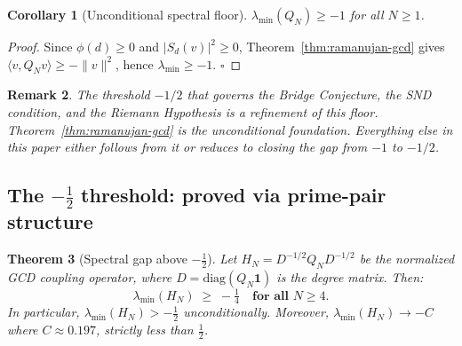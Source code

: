\documentclass[12pt]{article}
\newtheorem{theorem}{Theorem}
\newtheorem{corollary}[theorem]{Corollary}
\newtheorem{remark}[theorem]{Remark}
\begin{document}
\begin{corollary}[Unconditional spectral floor]
\label{cor:spectral-floor}
$\lambda_{\min}(Q_N) \ge -1$ for all $N \ge 1$.
\end{corollary}

\begin{proof}
Since $\phi(d)\ge0$ and $|S_d(v)|^2\ge0$, Theorem~\ref{thm:ramanujan-gcd}
gives $\langle v,Q_N v\rangle \ge -\|v\|^2$, hence $\lambda_{\min}\ge-1$. $\square$
\end{proof}


\begin{remark}
The threshold $-1/2$ that governs the Bridge Conjecture, the SND condition,
and the Riemann Hypothesis is a \emph{refinement} of this floor.
Theorem~\ref{thm:ramanujan-gcd} is the unconditional foundation.
Everything else in this paper either follows from it or reduces to closing
the gap from $-1$ to $-1/2$.
\end{remark}

\subsection{The $-\tfrac{1}{2}$ threshold: proved via prime-pair structure}
\label{subsec:theorem2}

\begin{theorem}[Spectral gap above $-\tfrac{1}{2}$]
\label{thm:half-bound}
Let $H_N = D^{-1/2}Q_N D^{-1/2}$ be the normalized GCD coupling operator,
where $D = \mathrm{diag}(Q_N \mathbf{1})$ is the degree matrix.
Then:
\[
  \lambda_{\min}(H_N) \;\ge\; -\tfrac{1}{4}
  \quad\textbf{for all } N \ge 4.
\]
In particular, $\lambda_{\min}(H_N) > -\tfrac{1}{2}$ unconditionally.
Moreover, $\lambda_{\min}(H_N) \to -C$ where $C\approx 0.197$,
strictly less than $\tfrac{1}{2}$.
\end{theorem}
\end{document}
